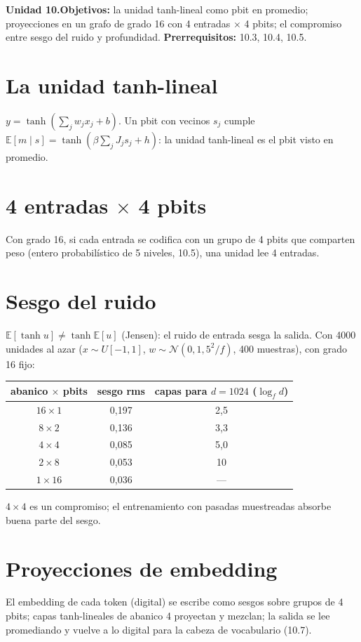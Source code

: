 \documentclass[11pt,a4paper]{article}
\begin{document}

\noindent\textbf{Unidad 10.}\quad\textbf{Objetivos:} la unidad tanh-lineal como pbit en promedio; proyecciones en un grafo de grado 16 con 4 entradas $\times$ 4 pbits;
el compromiso entre sesgo del ruido y profundidad.
\textbf{Prerrequisitos:} 10.3, 10.4, 10.5.

\section{La unidad tanh-lineal}
$y=\tanh(\sum_jw_jx_j+b)$. Un pbit con vecinos $s_j$ cumple $\mathbb E[m\mid s]=\tanh(\beta\sum_jJ_js_j+h)$: la unidad tanh-lineal es el pbit visto en promedio.

\section{4 entradas $\times$ 4 pbits}
Con grado 16, si cada entrada se codifica con un grupo de 4 pbits que comparten peso (entero probabilístico de 5 niveles, 10.5), una unidad lee 4 entradas.

\section{Sesgo del ruido \evS}
$\mathbb E[\tanh u]\ne\tanh\mathbb E[u]$ (Jensen): el ruido de entrada sesga la salida. Con 4000 unidades al azar ($x\sim U[-1,1]$, $w\sim\mathcal N(0,1{,}5^2/f)$,
400 muestras), con grado 16 fijo:
\begin{center}\small\begin{tabular}{ccc}\toprule
abanico $\times$ pbits & sesgo rms & capas para $d=1024$ ($\log_fd$)\\\midrule
$16\times1$ & 0{,}197 & 2{,}5\\ $8\times2$ & 0{,}136 & 3{,}3\\ $4\times4$ & 0{,}085 & 5{,}0\\ $2\times8$ & 0{,}053 & 10\\ $1\times16$ & 0{,}036 & ---\\\bottomrule
\end{tabular}\end{center}
$4\times4$ es un compromiso; el entrenamiento con pasadas muestreadas absorbe buena parte del sesgo.

\section{Proyecciones de embedding}
El embedding de cada token (digital) se escribe como sesgos sobre grupos de 4 pbits; capas tanh-lineales de abanico 4 proyectan y mezclan; la salida se lee promediando
y vuelve a lo digital para la cabeza de vocabulario (10.7).
\end{document}
